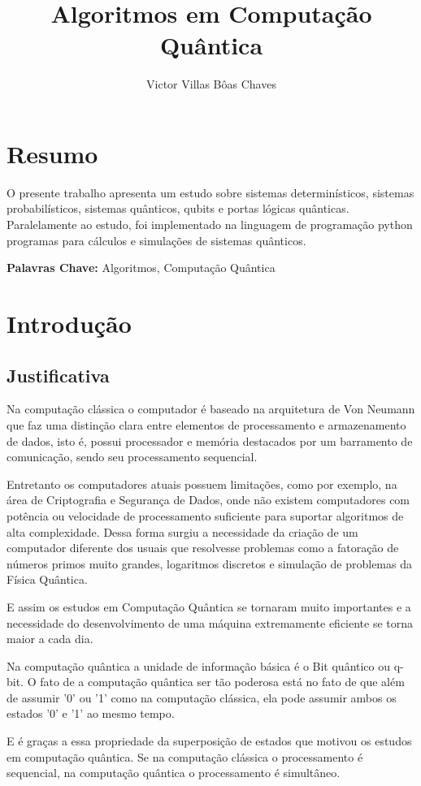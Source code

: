 \documentclass{imetex-inci}
\author{Victor Villas Bôas Chaves}
\title{Algoritmos em Computação Quântica}
\date{\the\year}
\begin{document}
 
\printFrontMatter

\chapter*{Resumo}
O presente trabalho apresenta um estudo sobre sistemas determinísticos, sistemas probabilísticos, sistemas quânticos, qubits e portas lógicas quânticas. Paralelamente ao estudo, foi implementado na linguagem de programação python programas para cálculos e simulações de sistemas quânticos.

\textbf{Palavras Chave:} Algoritmos, Computação Quântica

\chapter{Introdução}
\section{Justificativa}
Na computação clássica o computador é baseado na arquitetura de Von Neumann que faz uma distinção clara entre elementos de processamento e armazenamento de dados, isto é, possui processador e memória destacados por um barramento de comunicação, sendo seu processamento sequencial.
 
 Entretanto os computadores atuais possuem limitações, como por exemplo, na área de Criptografia e Segurança de Dados, onde não existem computadores com potência ou velocidade de processamento suficiente para suportar algoritmos de alta complexidade. Dessa forma surgiu a necessidade da criação de um computador diferente dos usuais que resolvesse problemas como a fatoração de números primos muito grandes, logaritmos discretos e simulação de problemas da Física Quântica.
 
 E assim os estudos em Computação Quântica se tornaram muito importantes e a necessidade do desenvolvimento de uma máquina extremamente eficiente se torna maior a cada dia.
 
 Na computação quântica a unidade de informação básica é o Bit quântico ou q-bit. O fato de a computação quântica ser tão poderosa está no fato de que além de assumir '0' ou '1' como na computação clássica, ela pode assumir ambos os estados '0' e '1' ao mesmo tempo.
 
 E é graças a essa propriedade da superposição de estados que motivou os estudos em computação quântica. Se na computação clássica o processamento é sequencial, na computação quântica o processamento é simultâneo.
 
\end{document}
